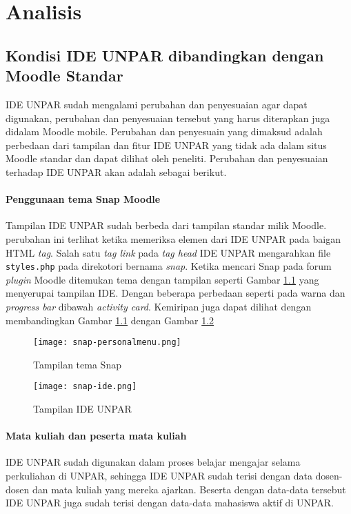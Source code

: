 \chapter{Analisis}
\label{chap:analsa}

\section{Kondisi IDE UNPAR dibandingkan dengan Moodle Standar}
\label{sec:Kondisi IDE UNPAR} 
IDE UNPAR sudah mengalami perubahan dan penyesuaian agar dapat digunakan, perubahan dan penyesuaian tersebut yang harus diterapkan juga didalam Moodle mobile. Perubahan dan penyesuain yang dimaksud adalah perbedaan dari tampilan dan fitur IDE UNPAR yang tidak ada dalam situs Moodle standar dan dapat dilihat oleh peneliti. Perubahan dan penyesuaian terhadap IDE UNPAR akan adalah sebagai berikut\cite{IDEUNPAR}.

\subsubsection {Penggunaan tema Snap Moodle}
	Tampilan IDE UNPAR sudah berbeda dari tampilan standar milik Moodle. perubahan ini terlihat ketika memeriksa elemen dari IDE UNPAR pada baigan HTML \textit{tag}. Salah satu \textit{tag link} pada \textit{tag head} IDE UNPAR mengarahkan file \texttt{styles.php} pada direkotori bernama \textit{snap}. Ketika mencari Snap pada forum \textit{plugin} Moodle ditemukan tema dengan tampilan seperti Gambar \ref{fig:snap-personal} yang menyerupai tampilan IDE. Dengan beberapa perbedaan seperti pada warna dan \textit{progress bar} dibawah \textit{activity card}. Kemiripan juga dapat dilihat dengan membandingkan Gambar \ref{fig:snap-personal} dengan Gambar \ref{fig:snap-ide}

\begin{figure}[H] 
	\centering  
	\texttt{[image: snap-personalmenu.png]}  
	\caption[Tampilan dashboard tema Snap] {Tampilan tema Snap} 
	\label{fig:snap-personal} 
\end{figure} 

\begin{figure}[H] 
	\centering  
	\texttt{[image: snap-ide.png]}  
	\caption[Tampilan dashboard IDE UNPAR] {Tampilan IDE UNPAR} 
	\label{fig:snap-ide} 
\end{figure} 
\subsubsection {Mata kuliah dan peserta mata kuliah}
IDE UNPAR sudah digunakan dalam proses belajar mengajar selama perkuliahan di UNPAR, sehingga IDE UNPAR sudah terisi dengan data dosen-dosen dan mata kuliah yang mereka ajarkan. Beserta dengan data-data tersebut IDE UNPAR juga sudah terisi dengan data-data mahasiswa aktif di UNPAR.
